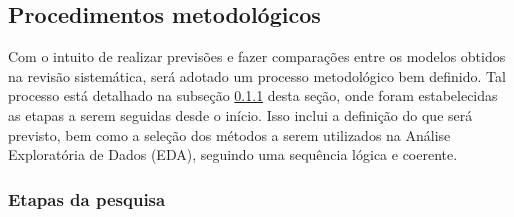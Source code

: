 \subsection{Procedimentos metodol{\'o}gicos} \label{subsec:metod}

Com o intuito de realizar previsões e fazer comparações entre os modelos obtidos na revisão sistemática, será adotado um processo metodológico bem definido. Tal processo está detalhado na subseção \ref{subsubsec:etp} desta seção, onde foram estabelecidas as etapas a serem seguidas desde o início. Isso inclui a definição do que será previsto, bem como a seleção dos métodos a serem utilizados na Análise Exploratória de Dados (EDA), seguindo uma sequência lógica e coerente.
   
    \subsubsection{Etapas da pesquisa}\label{subsubsec:etp}

